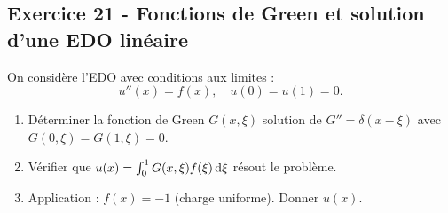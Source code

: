 \documentclass[12pt,a4paper]{article}
\begin{document}
\subsection*{Exercice 21 - Fonctions de Green et solution d'une EDO linéaire \niveau{\difficile}}

\begin{boiteexercice}
On considère l'EDO avec conditions aux limites :
\[
u''(x) = f(x), \quad u(0) = u(1) = 0.
\]
\begin{enumerate}
  \item Déterminer la fonction de Green $G(x,\xi)$ solution de $G'' = \delta(x-\xi)$ avec $G(0,\xi) = G(1,\xi) = 0$.
  \item Vérifier que $u(x) = \int_0^1 G(x,\xi) f(\xi)\,\mathrm{d}\xi$ résout le problème.
  \item Application : $f(x) = -1$ (charge uniforme). Donner $u(x)$.
\end{enumerate}
\end{boiteexercice}
\end{document}
